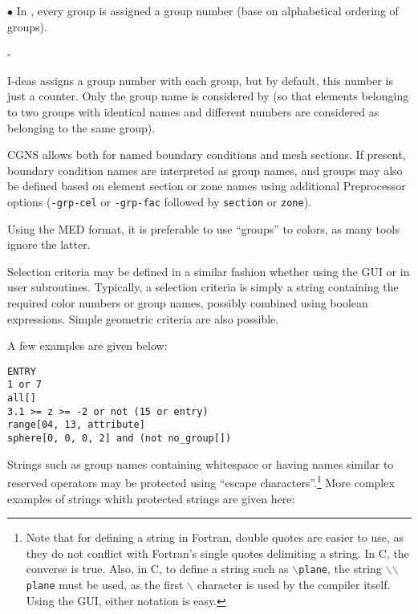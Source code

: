 {{{\begin{list}{$\bullet$}{}
In \CS, every group is assigned a group number (base on alphabetical
ordering of groups).
      \begin{list}{-}{}
      \item I-deas assigns a group number with each
            group, but by default, this number is just a counter.
            Only the group name is considered by \CS (so that elements
            belonging to two groups with identical names and different
            numbers are considered as belonging to the same group).
      \item CGNS allows both for named boundary conditions and mesh
            sections. If present, boundary condition names are
            interpreted as group names, and groups may also be defined
            based on element section or zone names using additional
            Preprocessor options (\texttt{-grp-cel} or
            \texttt{-grp-fac} followed by \texttt{section} or
            \texttt{zone}).
      \item Using the MED format, it is preferable to use ``groups''
            to colors, as many tools ignore the latter.
      \end{list}
\end{list}

Selection criteria may be defined in a similar fashion whether
using the GUI or in user subroutines.
Typically, a selection criteria is simply a string containing
the required color numbers or group names, possibly combined
using boolean expressions. Simple geometric criteria are also
possible.

A few examples are given below:

\verb+ENTRY+\\
\verb+1 or 7+\\
\verb+all[]+\\
\verb+3.1 >= z >= -2 or not (15 or entry)+\\
\verb+range[04, 13, attribute]+\\
\verb+sphere[0, 0, 0, 2] and (not no_group[])+

Strings such as group names containing whitespace
or having names similar to reserved operators may be protected
using ``escape characters''.\footnote{Note that for defining a
string in Fortran, double quotes are easier to use, as they do not
conflict with Fortran's single quotes delimiting a string.
In C, the converse is true. Also, in C, to define a string
such as \texttt{{$\backslash$}plane}, the string
\texttt{{$\backslash$}{$\backslash$}plane} must be
used, as the first $\backslash$ character is used by the
compiler itself. Using the GUI, either notation is easy.}
More complex examples of strings whith protected strings are given here:

}}}

